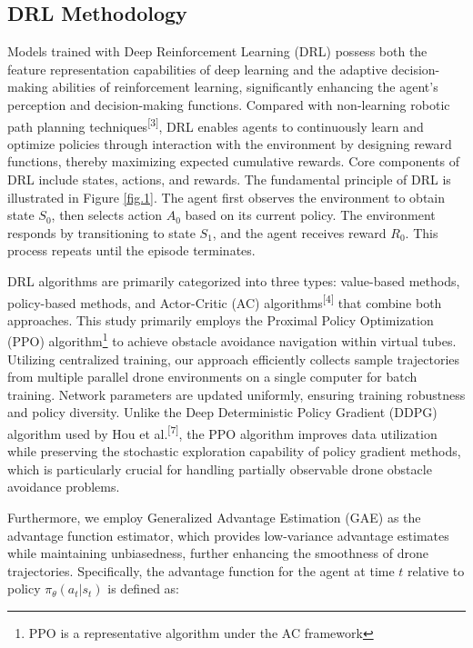 \documentclass[preprint,12pt,authoryear]{elsarticle}
\begin{document}
\subsection{DRL Methodology}

Models trained with Deep Reinforcement Learning (DRL) possess both the feature representation capabilities of deep learning and the adaptive decision-making abilities of reinforcement learning, significantly enhancing the agent's perception and decision-making functions. Compared with non-learning robotic path planning techniques\textsuperscript{[3]}, DRL enables agents to continuously learn and optimize policies through interaction with the environment by designing reward functions, thereby maximizing expected cumulative rewards. Core components of DRL include states, actions, and rewards. The fundamental principle of DRL is illustrated in Figure \ref{fig.1}. The agent first observes the environment to obtain state \( S_0 \), then selects action \( A_0 \) based on its current policy. The environment responds by transitioning to state \( S_1 \), and the agent receives reward \( R_0 \). This process repeats until the episode terminates.


DRL algorithms are primarily categorized into three types: value-based methods, policy-based methods, and Actor-Critic (AC) algorithms\textsuperscript{[4]} that combine both approaches. This study primarily employs the Proximal Policy Optimization (PPO) algorithm\footnote{PPO is a representative algorithm under the AC framework} to achieve obstacle avoidance navigation within virtual tubes. Utilizing centralized training, our approach efficiently collects sample trajectories from multiple parallel drone environments on a single computer for batch training. Network parameters are updated uniformly, ensuring training robustness and policy diversity. Unlike the Deep Deterministic Policy Gradient (DDPG) algorithm used by Hou et al.\textsuperscript{[7]}, the PPO algorithm improves data utilization while preserving the stochastic exploration capability of policy gradient methods, which is particularly crucial for handling partially observable drone obstacle avoidance problems.

Furthermore, we employ Generalized Advantage Estimation (GAE) as the advantage function estimator, which provides low-variance advantage estimates while maintaining unbiasedness, further enhancing the smoothness of drone trajectories. Specifically, the advantage function for the agent at time \( t \) relative to policy \( \pi_{\theta} (a_t | s_t) \) is defined as:
\end{document}
